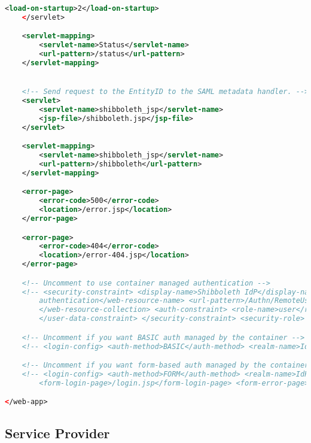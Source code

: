 \begin{lstlisting}[language=xml]
        <load-on-startup>2</load-on-startup>
    </servlet>

    <servlet-mapping>
        <servlet-name>Status</servlet-name>
        <url-pattern>/status</url-pattern>
    </servlet-mapping>


    <!-- Send request to the EntityID to the SAML metadata handler. -->
    <servlet>
        <servlet-name>shibboleth_jsp</servlet-name>
        <jsp-file>/shibboleth.jsp</jsp-file>
    </servlet>

    <servlet-mapping>
        <servlet-name>shibboleth_jsp</servlet-name>
        <url-pattern>/shibboleth</url-pattern>
    </servlet-mapping>

    <error-page>
        <error-code>500</error-code>
        <location>/error.jsp</location>
    </error-page>

    <error-page>
        <error-code>404</error-code>
        <location>/error-404.jsp</location>
    </error-page>

    <!-- Uncomment to use container managed authentication -->
    <!-- <security-constraint> <display-name>Shibboleth IdP</display-name> <web-resource-collection> <web-resource-name>user
        authentication</web-resource-name> <url-pattern>/Authn/RemoteUser</url-pattern> <http-method>GET</http-method> <http-method>POST</http-method>
        </web-resource-collection> <auth-constraint> <role-name>user</role-name> </auth-constraint> <user-data-constraint> <transport-guarantee>CONFIDENTIAL</transport-guarantee>
        </user-data-constraint> </security-constraint> <security-role> <role-name>user</role-name> </security-role> -->

    <!-- Uncomment if you want BASIC auth managed by the container -->
    <!-- <login-config> <auth-method>BASIC</auth-method> <realm-name>IdP Password Authentication</realm-name> </login-config> -->

    <!-- Uncomment if you want form-based auth managed by the container -->
    <!-- <login-config> <auth-method>FORM</auth-method> <realm-name>IdP Password Authentication</realm-name> <form-login-config>
        <form-login-page>/login.jsp</form-login-page> <form-error-page>/login-error.jsp</form-error-page> </form-login-config> </login-config> -->

</web-app>
\end{lstlisting}

\subsection{Service Provider}
